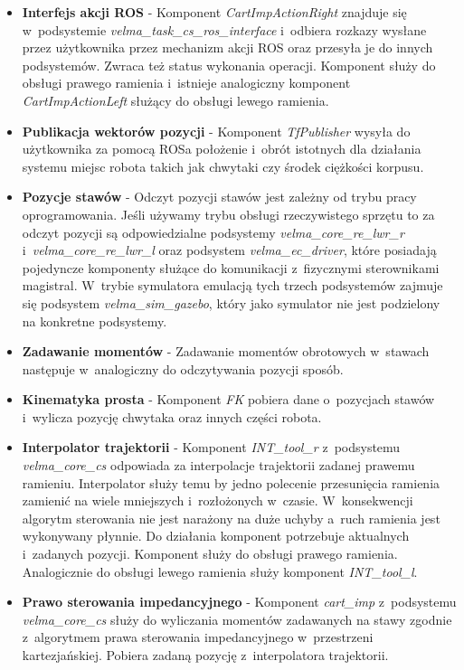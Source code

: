 \begin{itemize}
	\item \textbf{Interfejs akcji ROS} - 
	Komponent \textit{CartImpActionRight} znajduje się w~podsystemie \textit{velma\_task\_cs\_ros\_interface} i~odbiera rozkazy wysłane przez użytkownika przez mechanizm akcji ROS oraz przesyła je do innych podsystemów. Zwraca też status wykonania operacji. Komponent służy do obsługi prawego ramienia i~istnieje analogiczny komponent \textit{CartImpActionLeft} służący do obsługi lewego ramienia.
	\item \textbf{Publikacja wektorów pozycji} - 
	Komponent \textit{TfPublisher} wysyła do użytkownika za pomocą ROSa położenie i~obrót istotnych dla działania systemu miejsc robota takich jak chwytaki czy środek ciężkości korpusu. 
	\item \textbf{Pozycje stawów} - 
	Odczyt pozycji stawów jest zależny od trybu pracy oprogramowania. Jeśli używamy trybu obsługi rzeczywistego sprzętu to za odczyt pozycji są odpowiedzialne podsystemy \textit{velma\_core\_re\_lwr\_r} i~\textit{velma\_core\_re\_lwr\_l} oraz podsystem \textit{velma\_ec\_driver}, które posiadają pojedyncze komponenty służące do komunikacji z~fizycznymi sterownikami magistral. W~trybie symulatora emulacją tych trzech podsystemów zajmuje się podsystem \textit{velma\_sim\_gazebo}, który jako symulator nie jest podzielony na konkretne podsystemy.
	\item \textbf{Zadawanie momentów} - 
	Zadawanie momentów obrotowych w~stawach następuje w~analogiczny do odczytywania pozycji sposób.
	\item \textbf{Kinematyka prosta} - 
	Komponent \textit{FK} pobiera dane o~pozycjach stawów i~wylicza pozycję chwytaka oraz innych części robota.
	\item \textbf{Interpolator trajektorii} - 
	Komponent \textit{INT\_tool\_r} z~podsystemu \textit{velma\_core\_cs} odpowiada za interpolacje trajektorii zadanej prawemu ramieniu. Interpolator służy temu by jedno polecenie przesunięcia ramienia zamienić na wiele mniejszych i~rozłożonych w~czasie. W~konsekwencji algorytm sterowania nie jest narażony na duże uchyby a~ruch ramienia jest wykonywany płynnie. Do działania komponent potrzebuje aktualnych i~zadanych pozycji. Komponent służy do obsługi prawego ramienia. Analogicznie do obsługi lewego ramienia służy komponent \textit{INT\_tool\_l}.
	
	\item \textbf{Prawo sterowania impedancyjnego} - 
	Komponent \textit{cart\_imp} z~podsystemu \textit{velma\_core\_cs} służy do wyliczania momentów zadawanych na stawy zgodnie z~algorytmem prawa sterowania impedancyjnego w~przestrzeni kartezjańskiej. Pobiera zadaną pozycję z~interpolatora trajektorii.
\end{itemize}

